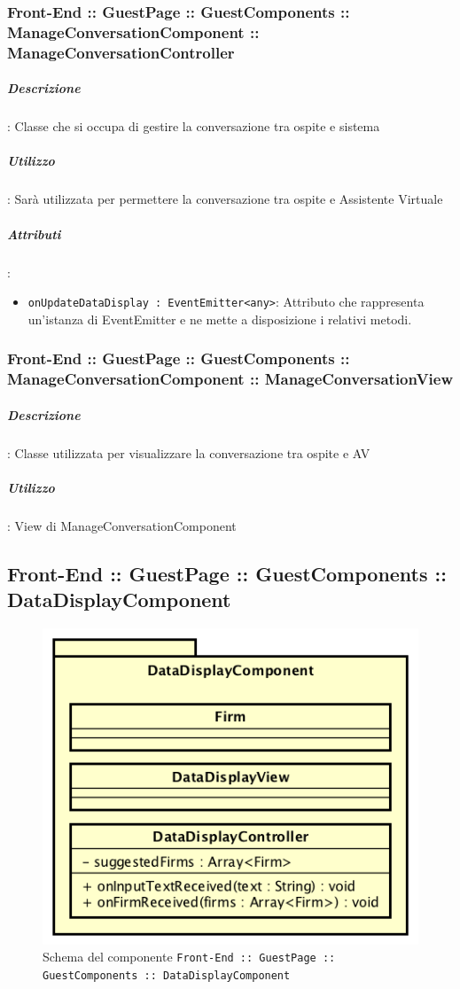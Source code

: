 \documentclass[../ManualeSviluppatore_v2.0.0.tex]{subfiles}
\begin{document}
			\subsubsection{Front-End :: GuestPage :: GuestComponents :: ManageConversationComponent :: ManageConversationController}

				\subparagraph{Descrizione}: Classe che si occupa di gestire la conversazione tra ospite e sistema
				\subparagraph{Utilizzo}: Sarà utilizzata per permettere la conversazione tra ospite e Assistente Virtuale
				\subparagraph{Attributi}:
				\begin{itemize}
					\item \texttt{onUpdateDataDisplay : EventEmitter<any>}: Attributo che rappresenta un'istanza di EventEmitter e ne mette a disposizione i relativi metodi.
				\end{itemize}
			\subsubsection{Front-End :: GuestPage :: GuestComponents :: ManageConversationComponent :: ManageConversationView}

				\subparagraph{Descrizione}: Classe utilizzata per visualizzare la conversazione tra ospite e AV
				\subparagraph{Utilizzo}: View di ManageConversationComponent

	\newpage
	\subsection{Front-End :: GuestPage :: GuestComponents :: DataDisplayComponent}
	\begin{figure}[!h]
		\centering
		\includegraphics[scale=0.7]{Architettura/Front-End/GuestPage/GuestComponents/DataDisplayComponent.png}
		\caption{Schema del componente \texttt{Front-End :: GuestPage :: GuestComponents :: DataDisplayComponent}}
	\end{figure}
\end{document}
